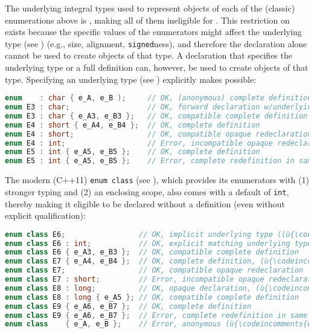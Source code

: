 \noindent The underlying integral types used to represent objects of each of the
(classic) enumerations above is , making
all of them ineligible for . This restriction
on  exists because the specific values of
the enumerators might affect the underlying type (see ) (e.g.,
size, alignment, \lstinline!signed!ness), and therefore the declaration
alone cannot be used to create objects of that type. A declaration that
specifies the underlying type or a full definition can, however, be used
to create objects of that type. Specifying an underlying
type (see ) explicitly makes  possible:

\begin{lstlisting}[language=C++]
enum    : char { e_A, e_B );     // OK, (anonymous) complete definition
enum E3 : char;                  // OK, forward declaration w/underlying type
enum E3 : char { e_A3, e_B3 };   // OK, compatible complete definition
enum E4 : short { e_A4, e_B4 };  // OK, complete definition
enum E4 : short;                 // OK, compatible opaque redeclaration
enum E4 : int;                   // Error, incompatible opaque redeclaration
enum E5 : int { e_A5, e_B5 };    // OK, complete definition
enum E5 : int { e_A5, e_B5 };    // Error, complete redefinition in same TU
\end{lstlisting}

\noindent The modern (C++11) \lstinline!enum!~\lstinline!class! (see ), which
provides its enumerators with (1) stronger typing and (2) an enclosing
scope, also comes with a default  of
\lstinline!int!, thereby making it eligible to be declared without a
definition (even without explicit qualification):

\begin{lstlisting}[language=C++]
enum class E6;                 // OK, implicit underlying type ((ù{\codeincomments{int}}ù))
enum class E6 : int;           // OK, explicit matching underlying type
enum class E6 { e_A3, e_B3 };  // OK, compatible complete definition
enum class E7 { e_A4, e_B4 };  // OK, complete definition, (ù{\codeincomments{int}}ù) underlying type
enum class E7;                 // OK, compatible opaque redeclaration
enum class E7 : short;         // Error, incompatible opaque redeclaration
enum class E8 : long;          // OK, opaque declaration, (ù{\codeincomments{long}}ù) underlying type
enum class E8 : long { e_A5 }; // OK, compatible complete definition
enum class E9 { e_A6, e_B7 };  // OK, complete definition
enum class E9 { e_A6, e_B7 };  // Error, complete redefinition in same TU
enum class    { e_A, e_B };    // Error, anonymous (ù{\codeincomments{enum}}ù) classes are not allowed
\end{lstlisting}

